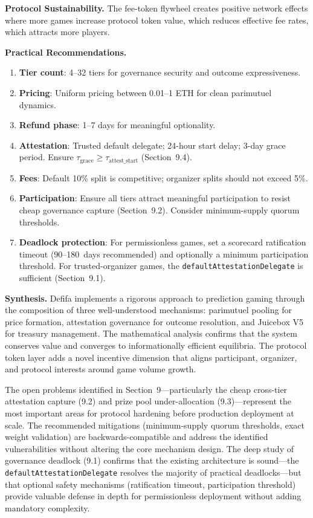 \documentclass[11pt,a4paper]{article}
\begin{document}
\textbf{Protocol Sustainability.} The fee-token flywheel creates positive network effects where more games increase protocol token value, which reduces effective fee rates, which attracts more players.

\textbf{Practical Recommendations.}
\begin{enumerate}[nosep]
    \item \textbf{Tier count}: 4--32 tiers for governance security and outcome expressiveness.
    \item \textbf{Pricing}: Uniform pricing between 0.01--1 ETH for clean parimutuel dynamics.
    \item \textbf{Refund phase}: 1--7 days for meaningful optionality.
    \item \textbf{Attestation}: Trusted default delegate; 24-hour start delay; 3-day grace period. Ensure $\tau_{\text{grace}} \geq \tau_{\text{attest\_start}}$ (Section~9.4).
    \item \textbf{Fees}: Default 10\% split is competitive; organizer splits should not exceed 5\%.
    \item \textbf{Participation}: Ensure all tiers attract meaningful participation to resist cheap governance capture (Section~9.2). Consider minimum-supply quorum thresholds.
    \item \textbf{Deadlock protection}: For permissionless games, set a scorecard ratification timeout (90--180~days recommended) and optionally a minimum participation threshold. For trusted-organizer games, the \texttt{defaultAttestationDelegate} is sufficient (Section~9.1).
\end{enumerate}

\textbf{Synthesis.} Defifa implements a rigorous approach to prediction gaming through the composition of three well-understood mechanisms: parimutuel pooling for price formation, attestation governance for outcome resolution, and Juicebox V5 for treasury management. The mathematical analysis confirms that the system conserves value and converges to informationally efficient equilibria. The protocol token layer adds a novel incentive dimension that aligns participant, organizer, and protocol interests around game volume growth.

The open problems identified in Section~9---particularly the cheap cross-tier attestation capture (9.2) and prize pool under-allocation (9.3)---represent the most important areas for protocol hardening before production deployment at scale. The recommended mitigations (minimum-supply quorum thresholds, exact weight validation) are backwards-compatible and address the identified vulnerabilities without altering the core mechanism design. The deep study of governance deadlock (9.1) confirms that the existing architecture is sound---the \texttt{defaultAttestationDelegate} resolves the majority of practical deadlocks---but that optional safety mechanisms (ratification timeout, participation threshold) provide valuable defense in depth for permissionless deployment without adding mandatory complexity.
\end{document}
